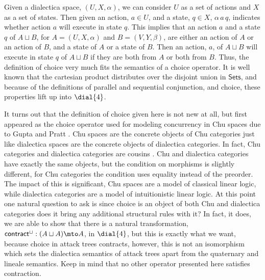 Given a dialectica space, $(U, X, \alpha)$, we can consider $U$ as a
set of actions and $X$ as a set of states.  Then given an action, $a
\in U$, and a state, $q \in X$, $\alpha\,a\,q$, indicates whether
action $a$ will execute in state $q$.  This implies that an action $a$
and a state $q$ of $A \sqcup B$, for $A = (U , X , \alpha)$ and $B =
(V , Y , \beta)$, are either an action of $A$ or an action of $B$, and
a state of $A$ or a state of $B$.  Then an action, $a$, of $A \sqcup
B$ will execute in state $q$ of $A \sqcup B$ if they are both from $A$
or both from $B$.  Thus, the definition of choice very much fits the
semantics of a choice operator.  It is well known that the cartesian
product distributes over the disjoint union in $\mathsf{Sets}$, and
because of the definitions of parallel and sequential conjunction, and
choice, these properties lift up into $\dial{4}$.

It turns out that the definition of choice given here is not new at
all, but first appeared as the choice operator used for modeling
concurrency in Chu spaces due to Gupta and Pratt \cite{Gupta:1994}.
Chu spaces are the concrete objects of Chu categories just like
dialectica spaces are the concrete objects of dialectica categories.
In fact, Chu categories and dialectica categories are cousins
\cite{dePaiva:2006b}.  Chu and dialectica categories have exactly the
same objects, but the condition on morphisms is slightly different,
for Chu categories the condition uses equality instead of the
preorder.  The impact of this is significant, Chu spaces are a model
of classical linear logic, while dialectica categories are a model of
intuitionistic linear logic.  At this point one natural question to
ask is since choice is an object of both Chu and dialectica categories
does it bring any additional structural rules with it?  In fact, it
does, we are able to show that there is a natural transformation,
$\mathsf{contract}^\sqcup : (A \sqcup A) \mto A$, in $\dial{4}$, but
this is exactly what we want, because choice in attack trees
contracts, however, this is not an isomorphism which sets the
dialectica semantics of attack trees apart from the quaternary and
lineale semantics.  Keep in mind that no other operator presented here
satisfies contraction.

